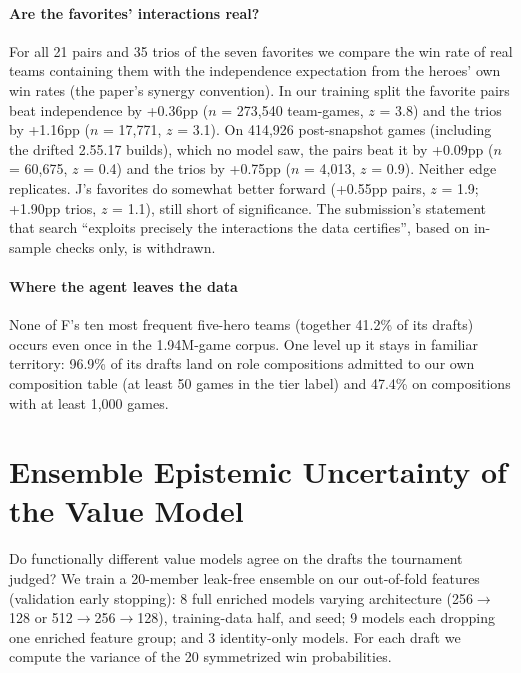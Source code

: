 \documentclass[journal]{IEEEtran}
\begin{document}
\paragraph{Are the favorites' interactions real?} For all 21 pairs and 35 trios of the seven favorites we compare the win rate of real teams containing them with the independence expectation from the heroes' own win rates (the paper's synergy convention). In our training split the favorite pairs beat independence by +0.36pp ($n$ = 273,540 team-games, $z$ = 3.8) and the trios by +1.16pp ($n$ = 17,771, $z$ = 3.1). On 414,926 post-snapshot games (including the drifted 2.55.17 builds), which no model saw, the pairs beat it by +0.09pp ($n$ = 60,675, $z$ = 0.4) and the trios by +0.75pp ($n$ = 4,013, $z$ = 0.9). Neither edge replicates. J's favorites do somewhat better forward (+0.55pp pairs, $z$ = 1.9; +1.90pp trios, $z$ = 1.1), still short of significance. The submission's statement that search ``exploits precisely the interactions the data certifies'', based on in-sample checks only, is withdrawn.

\paragraph{Where the agent leaves the data} None of F's ten most frequent five-hero teams (together 41.2\% of its drafts) occurs even once in the 1.94M-game corpus. One level up it stays in familiar territory: 96.9\% of its drafts land on role compositions admitted to our own composition table (at least 50 games in the tier label) and 47.4\% on compositions with at least 1,000 games.

\section{Ensemble Epistemic Uncertainty of the Value Model}
\label{sec:ensemble}

Do functionally different value models agree on the drafts the tournament judged? We train a 20-member leak-free ensemble on our out-of-fold features (validation early stopping): 8 full enriched models varying architecture (256$\to$128 or 512$\to$256$\to$128), training-data half, and seed; 9 models each dropping one enriched feature group; and 3 identity-only models. For each draft we compute the variance of the 20 symmetrized win probabilities.
\end{document}
